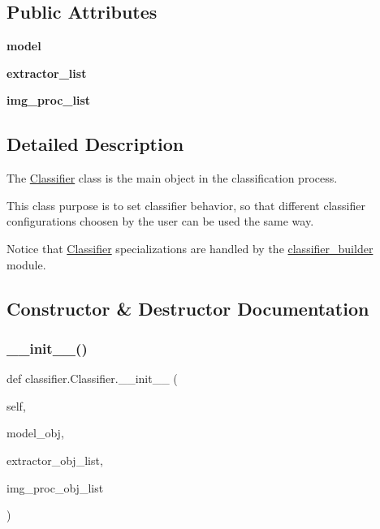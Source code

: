 \subsection*{Public Attributes}
\begin{DoxyCompactItemize}
\item 
\mbox{\label{classclassifier_1_1_classifier_a5698b69d59b3cddf3be2f4926cbc38e3}} 
{\bfseries model}
\item 
\mbox{\label{classclassifier_1_1_classifier_aa254cd2ab507a382749321697a009ec9}} 
{\bfseries extractor\+\_\+list}
\item 
\mbox{\label{classclassifier_1_1_classifier_aa8991f94cfa538f18d71ff2ea8d97025}} 
{\bfseries img\+\_\+proc\+\_\+list}
\end{DoxyCompactItemize}


\subsection{Detailed Description}
The \mbox{\hyperlink{classclassifier_1_1_classifier}{Classifier}} class is the main object in the classification process. 

This class purpose is to set classifier behavior, so that different classifier configurations choosen by the user can be used the same way.

Notice that \mbox{\hyperlink{classclassifier_1_1_classifier}{Classifier}} specializations are handled by the \mbox{\hyperlink{namespaceclassifier__builder}{classifier\+\_\+builder}} module. 

\subsection{Constructor \& Destructor Documentation}
\mbox{\label{classclassifier_1_1_classifier_afe3f298d174edc880684ba282cf69785}} 
\subsubsection{\texorpdfstring{\+\_\+\+\_\+init\+\_\+\+\_\+()}{\_\_init\_\_()}}
{\footnotesize\ttfamily def classifier.\+Classifier.\+\_\+\+\_\+init\+\_\+\+\_\+ (\begin{DoxyParamCaption}\item[{}]{self,  }\item[{}]{model\+\_\+obj,  }\item[{}]{extractor\+\_\+obj\+\_\+list,  }\item[{}]{img\+\_\+proc\+\_\+obj\+\_\+list }\end{DoxyParamCaption})}



